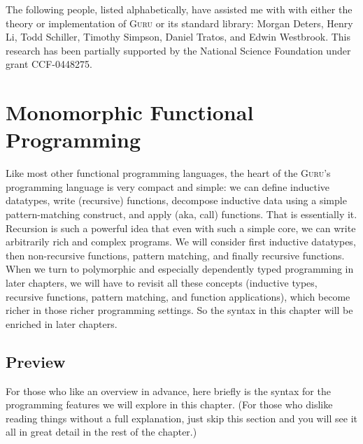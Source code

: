\documentclass{book}[12pt]
\newcommand{\guru}[0]{\textsc{Guru}\xspace}
\begin{document}
The following people, listed alphabetically, have assisted me with
with either the theory or implementation of \guru or its standard
library: Morgan Deters, Henry Li, Todd Schiller, Timothy Simpson,
Daniel Tratos, and Edwin Westbrook.  This research has been partially
supported by the National Science Foundation under grant CCF-0448275.

\chapter{Monomorphic Functional Programming}

Like most other functional programming languages, the heart of the
\guru's programming language is very compact and simple: we can define
inductive datatypes, write (recursive) functions, decompose inductive
data using a simple pattern-matching construct, and apply (aka, call)
functions.  That is essentially it.  Recursion is such a powerful idea
that even with such a simple core, we can write arbitrarily rich and
complex programs.  We will consider first inductive datatypes, then
non-recursive functions, pattern matching, and finally recursive
functions.  When we turn to polymorphic and especially dependently
typed programming in later chapters, we will have to revisit all these
concepts (inductive types, recursive functions, pattern matching, and
function applications), which become richer in those richer
programming settings.  So the syntax in this chapter will be enriched
in later chapters.

\section{Preview}

For those who like an overview in advance, here briefly is the syntax
for the programming features we will explore in this chapter. (For
those who dislike reading things without a full explanation, just skip
this section and you will see it all in great detail in the rest of
the chapter.)
\end{document}
